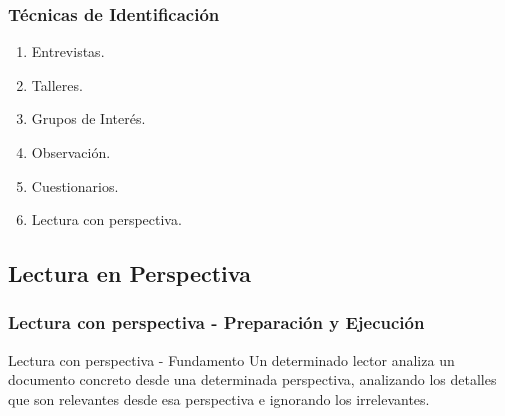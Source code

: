﻿\documentclass[handout,a4paper,slidestop,xcolor=pst,dvips,blue]{beamer}
\begin{document}
\begin{frame}[c]
    \frametitle{Técnicas de Identificación}
    \begin{enumerate}
         \item Entrevistas.
         \item Talleres.
         \item Grupos de Interés.
         \item Observación.
         \item Cuestionarios.
         \item \alert{Lectura con perspectiva}.
    \end{enumerate}
\end{frame}

\subsection{Lectura en Perspectiva}

\begin{frame}[c]
    \frametitle{Lectura con perspectiva - Preparación y Ejecución}
    \begin{block}{Lectura con perspectiva - Fundamento}
        Un determinado lector analiza un documento concreto desde una determinada perspectiva, analizando los detalles que son relevantes desde esa perspectiva e ignorando los irrelevantes.
    \end{block}
\end{frame}
\end{document}
